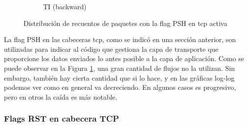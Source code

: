 \begin{figure}[H]
\begin{subfigure}[b]{0.26\textwidth}
        \caption{TI (backward)}
    \end{subfigure}
       \caption{Distribución de recuentos de paquetes con la flag PSH en \acrshort{tcp} activa}
       \label{fig:packet_pincer_bidirectional_tcp_psh_flags_count}
\end{figure}

La flag PSH en las cabeceras \acrshort{tcp}, como se indicó en una sección anterior, son utilizadas para indicar al código que gestiona la capa de transporte que proporcione los datos enviados lo antes posible a la capa de aplicación. Como se puede observar en la Figura \ref{fig:packet_pincer_bidirectional_tcp_psh_flags_count}, una gran cantidad de flujos no la utilizan. Sin embargo, también hay cierta cantidad que si lo hace, y en las gráficas log-log podemos ver como en general va decreciendo. En algunos casos es progresivo, pero en otros la caída es más notable.

\subsubsection{Flags RST en cabecera TCP}

